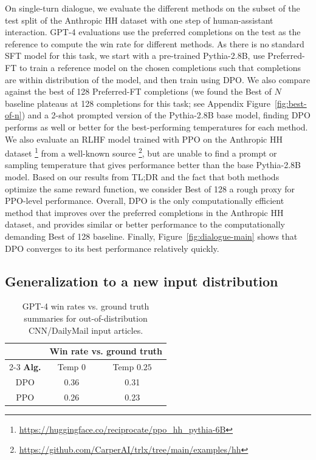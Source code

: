On single-turn dialogue, we evaluate the different methods on the subset of the test split of the Anthropic HH dataset \citep{bai2022training} with one step of human-assistant interaction. GPT-4 evaluations use the preferred completions on the test as the reference to compute the win rate for different methods. As there is no standard SFT model for this task, we start with a pre-trained Pythia-2.8B, use Preferred-FT to train a reference model on the chosen completions such that completions are within distribution of the model, and then train using DPO. We also compare against the best of 128 Preferred-FT completions (we found the Best of $N$ baseline plateaus at 128 completions for this task; see Appendix Figure~\ref{fig:best-of-n}) and a 2-shot prompted version of the Pythia-2.8B base model, finding DPO performs as well or better for the best-performing temperatures for each method. We also evaluate an RLHF model trained with PPO on the Anthropic HH dataset \footnote{\url{https://huggingface.co/reciprocate/ppo_hh_pythia-6B}} from a well-known source \footnote{\url{https://github.com/CarperAI/trlx/tree/main/examples/hh}}, but are unable to find a prompt or sampling temperature that gives performance better than the base Pythia-2.8B model. Based on our results from TL;DR and the fact that both methods optimize the same reward function, we consider Best of 128 a rough proxy for PPO-level performance. Overall, DPO is the only computationally efficient method that improves over the preferred completions in the Anthropic HH dataset, and provides similar or better performance to the computationally demanding Best of 128 baseline. Finally, Figure~\ref{fig:dialogue-main} shows that DPO converges to its best performance relatively quickly.

\subsection{Generalization to a new input distribution}

\begin{table}
    \small

    \begin{tabular}{ccc}
        \toprule
        & \multicolumn{2}{c}{\textbf{Win rate vs. ground truth}} \\
        \cmidrule(lr){2-3}
        \textbf{Alg.} & Temp $0$ & Temp $0.25$ \\
        \midrule
        DPO & 0.36 & 0.31 \\
        PPO & 0.26 & 0.23 \\
        \bottomrule
    \end{tabular}
    \caption{GPT-4 win rates vs. ground truth summaries for out-of-distribution CNN/DailyMail input articles.}

    \label{tab:ood}
\end{table}

